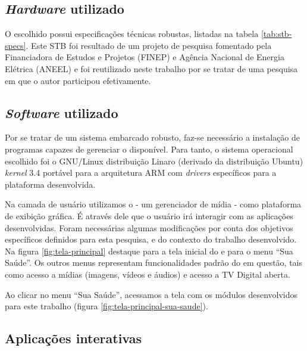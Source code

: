 \subsection{\textit{Hardware} utilizado}

O \stb[] escolhido possui especificações técnicas robustas, listadas na 
tabela \ref{tab:stb-specs}. Este STB foi resultado de um projeto de pesquisa
fomentado pela Financiadora de Estudos e Projetos (FINEP) e Agência Nacional
de Energia Elétrica (ANEEL) e foi reutilizado neste trabalho por se tratar de 
uma pesquisa em que o autor participou efetivamente.


\subsection{\textit{Software} utilizado}

Por se tratar de um sistema embarcado robusto, faz-se necessário a instalação
de programas capazes de gerenciar o \hardware[] disponível. Para tanto, o
sistema operacional escolhido foi o GNU/Linux distribuição Linaro (derivado da
distribuição Ubuntu) \textit{kernel} 3.4 portável para a arquitetura 
ARM com \textit{drivers} específicos para a plataforma desenvolvida.


Na camada de usuário utilizamos o \software[] \xbmc[] - um gerenciador de mídia
- como plataforma de exibição gráfica. É através dele que o usuário irá 
interagir com as aplicações desenvolvidas. Foram necessárias algumas 
modificações por conta dos objetivos específicos definidos para esta pesquisa,
e do contexto do trabalho desenvolvido. Na figura \ref{fig:tela-principal}
destaque para a tela inicial do \software[] \xbmc[] e para o menu ``Sua Saúde''.
Os outros menus representam funcionalidades padrão do \software[] em questão,
tais como acesso a mídias (imagens, vídeos e áudios) e acesso a TV Digital aberta.

Ao clicar no menu ``Sua Saúde'', acessamos a tela com os módulos desenvolvidos
para este trabalho (figura \ref{fig:tela-principal-sua-saude}). 


\subsection{Aplicações interativas} \label{subsec:aplicacoes-tv-health}


